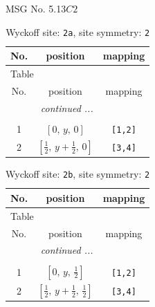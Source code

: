 \documentclass[fleqn,8pt]{jsarticle}
\begin{document}
\setcounter{MaxMatrixCols}{32}

\renewcommand{\tablename}{Table~}
\renewcommand{\figurename}{Figure~}
\begin{center}
\LARGE
MSG No. 5.13\quad$C2$
\end{center}
\renewcommand{\arraystretch}{1.2}
\begin{longtable}{ccc}
\caption{Wyckoff site: {\tt 2a}, site symmetry: {\tt 2}}
 \\
 \hline \hline
No. & position & mapping \\ \hline \endfirsthead

\multicolumn{2}{l}{\tablename\ \thetable{}} \\
 \hline \hline
No. & position & mapping \\ \hline \endhead

 \hline \hline
\multicolumn{2}{r}{\footnotesize\it continued ...} \\ \endfoot

 \hline \hline
\multicolumn{2}{r}{} \\ \endlastfoot

1 & $\left[ 0,\, y,\, 0 \right]$ & {\tt [1,2]} \\ \hline
2 & $\left[ \frac{1}{2},\, y + \frac{1}{2},\, 0 \right]$ & {\tt [3,4]} \\
\end{longtable}
\renewcommand{\arraystretch}{1.2}
\begin{longtable}{ccc}
\caption{Wyckoff site: {\tt 2b}, site symmetry: {\tt 2}}
 \\
 \hline \hline
No. & position & mapping \\ \hline \endfirsthead

\multicolumn{2}{l}{\tablename\ \thetable{}} \\
 \hline \hline
No. & position & mapping \\ \hline \endhead

 \hline \hline
\multicolumn{2}{r}{\footnotesize\it continued ...} \\ \endfoot

 \hline \hline
\multicolumn{2}{r}{} \\ \endlastfoot

1 & $\left[ 0,\, y,\, \frac{1}{2} \right]$ & {\tt [1,2]} \\ \hline
2 & $\left[ \frac{1}{2},\, y + \frac{1}{2},\, \frac{1}{2} \right]$ & {\tt [3,4]} \\
\end{longtable}
\renewcommand{\arraystretch}{1.2}
\end{document}
